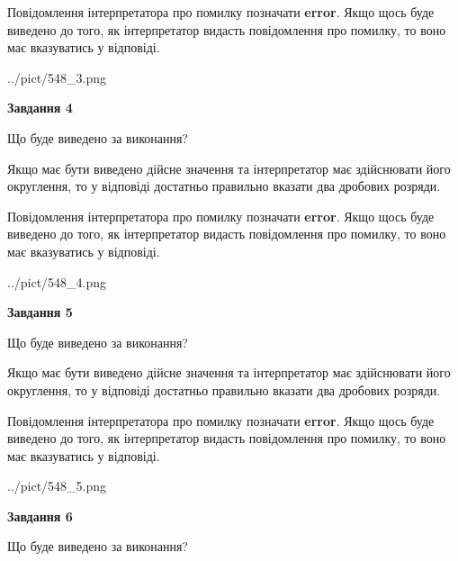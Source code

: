 \documentclass[12pt, ukrainian]{article}
\begin{document}
{\begin {Large}
Повідомлення інтерпретатора про помилку позначати \textbf{error}.
Якщо щось буде виведено до того, як інтерпретатор видасть повідомлення про помилку, 
то воно має вказуватись у відповіді. \par

\begin{center}
	{../pict/548_3.png}
\end{center}
\newpage

{\begin {center}\textbf{Завдання 4}\end {center}}\par
Що буде виведено за виконання? \par

Якщо має бути виведено дійсне значення та інтерпретатор має здійснювати його округлення, 
то у відповіді достатньо правильно вказати два дробових розряди.

Повідомлення інтерпретатора про помилку позначати \textbf{error}.
Якщо щось буде виведено до того, як інтерпретатор видасть повідомлення про помилку, 
то воно має вказуватись у відповіді. \par

\begin{center}
	{../pict/548_4.png}
\end{center}
\newpage

{\begin {center}\textbf{Завдання 5}\end {center}}\par
Що буде виведено за виконання? \par

Якщо має бути виведено дійсне значення та інтерпретатор має здійснювати його округлення, 
то у відповіді достатньо правильно вказати два дробових розряди.

Повідомлення інтерпретатора про помилку позначати \textbf{error}.
Якщо щось буде виведено до того, як інтерпретатор видасть повідомлення про помилку, 
то воно має вказуватись у відповіді. \par

\begin{center}
	{../pict/548_5.png}
\end{center}
\newpage

{\begin {center}\textbf{Завдання 6}\end {center}}\par
Що буде виведено за виконання? \par


\end{Large}}
\end{document}
